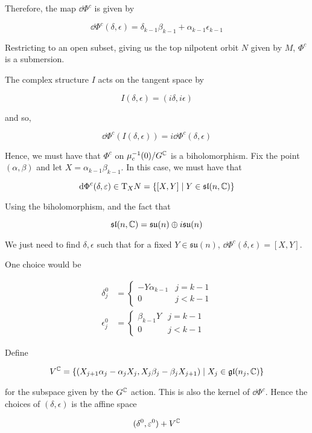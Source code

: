 \documentclass{article}
\newcommand{\su}{\mathfrak{su}}
\renewcommand{\sl}{\mathfrak{sl}}
\begin{document}
Therefore, the map \(\dd\Phi^c\) is given by

\[\dd\Phi^c(\delta, \epsilon) = \delta_{k-1}\beta_{k-1} + \alpha_{k-1}\epsilon_{k-1}\]

Restricting to an open subset, giving us the top nilpotent orbit \(N\) given by \(M\), \(\Phi^c\) is a submersion.

The complex structure \(I\) acts on the tangent space by

\[I(\delta, \epsilon) = (i\delta, i\epsilon)\]

and so,

\[\dd\Phi^c(I(\delta, \epsilon)) = i\dd\Phi^c(\delta, \epsilon)\]

Hence, we must have that \(\Phi^c\) on \(\mu_c^{-1}(0)/G^{\mathbb{C}}\) is a biholomorphism. Fix the point \((\alpha, \beta)\) and let \(X = \alpha_{k-1}\beta_{k-1}\). In this case, we must have that

\[\dd\Phi^c(\delta, \epsilon) \in \T_XN = \left\{[X, Y] \mid Y \in \sl(n, \C)\right\}\]

Using the biholomorphism, and the fact that

\[\sl(n, \C) = \su(n) \oplus i\su(n)\]

We just need to find \(\delta, \epsilon\) such that for a fixed \(Y \in \su(n)\), \(\dd\Phi^c(\delta, \epsilon) = [X, Y]\).

One choice would be

\begin{align*}
    \delta^0_j &= \begin{cases}
        -Y\alpha_{k-1} & j = k-1 \\
        0 & j < k-1
    \end{cases} \\
    \epsilon^0_j &= \begin{cases}
        \beta_{k-1}Y & j = k-1 \\
        0 & j < k-1
    \end{cases}
\end{align*}

Define

\[V^{\mathbb{C}} = \left\{(X_{j+1}\alpha_j - \alpha_jX_j, X_j\beta_j - \beta_jX_{j+1}) \mid X_j \in \mathfrak{g}\mathfrak{l}(n_j, \mathbb{C})\right\}\]

for the subspace given by the \(G^{\mathbb{C}}\) action. This is also the kernel of \(\dd\Phi^c\). Hence the choices of \((\delta, \epsilon)\) is the affine space

\[(\delta^0, \varepsilon^0) + V^{\mathbb{C}}\]

\printbibliography
\end{document}

